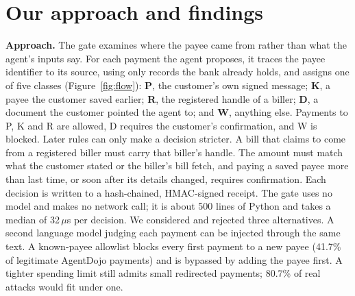 \documentclass[10pt,a4paper]{article}
\begin{document}
\section{Our approach and findings}
\textbf{Approach.} The gate examines where the payee came from rather than what the agent's inputs say. For each payment the
agent proposes, it traces the payee identifier to its source, using only records the bank already holds, and assigns one of
five classes (Figure~\ref{fig:flow}): \textbf{P}, the customer's own signed message; \textbf{K}, a payee the customer saved
earlier; \textbf{R}, the registered handle of a biller; \textbf{D}, a document the customer pointed the agent to; and
\textbf{W}, anything else. Payments to P, K and R are allowed, D requires the customer's confirmation, and W is blocked.
Later rules can only make a decision stricter. A bill that claims to come from a registered biller must carry that biller's
handle. The amount must match what the customer stated or the biller's bill fetch, and paying a saved payee more than last
time, or soon after its details changed, requires confirmation. Each decision is written to a hash-chained, HMAC-signed
receipt. The gate uses no model and makes no network call; it is about 500 lines of Python and takes a median of 32\,$\mu$s
per decision. We considered and rejected three alternatives. A second language model
judging each payment can be injected through the same text. A known-payee allowlist blocks every first payment to a new
payee (41.7\% of legitimate AgentDojo payments) and is bypassed by adding the payee first. A tighter spending limit still
admits small redirected payments; 80.7\% of real attacks would fit under one.
\end{document}
